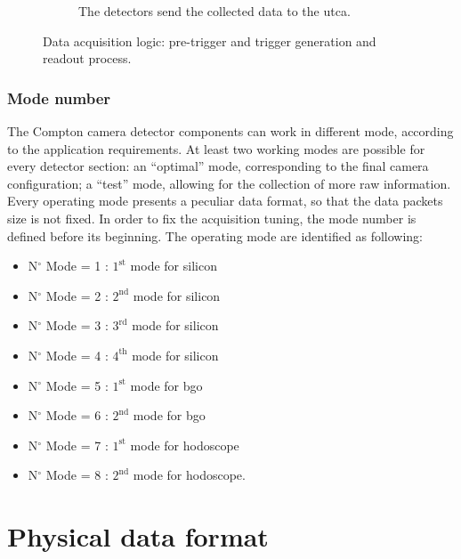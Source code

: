 \begin{figure}
\begin{subfigure}[t]{0.5\textwidth}
\caption[The detectors send the collected data to the \gls{utca}.]{The detectors send the collected data to the \gls{utca}.}\label{chapappA::subfig::triggerLogic_6}
\end{subfigure}%
\caption{Data acquisition logic: pre-trigger and trigger generation and readout process.}
\label{chapappA::fig::triggerGeneration}
\end{figure}


\subsubsection{Mode number}\label{chapappA::subsubsec::modeN}
The Compton camera detector components can work in different mode, according to the application requirements. At least two working modes are possible for every detector section: an \enquote{optimal} mode, corresponding to the final camera configuration; a \enquote{test} mode, allowing for the collection of more raw information. Every operating mode presents a peculiar data format, so that the data packets size is not fixed. In order to fix the acquisition tuning, the mode number is defined before its beginning.\newline
The operating mode are identified as following: \newline
\begin{itemize}
	\item N$^{\circ}$ Mode = 1 : $1^{\mathrm{st}}$ mode for silicon
	\item N$^{\circ}$ Mode = 2 : $2^{\mathrm{nd}}$ mode for silicon
	\item N$^{\circ}$ Mode = 3 : $3^{\mathrm{rd}}$ mode for silicon
	\item N$^{\circ}$ Mode = 4 : $4^{\mathrm{th}}$ mode for silicon
	\item N$^{\circ}$ Mode = 5 : $1^{\mathrm{st}}$ mode for \gls{bgo}
	\item N$^{\circ}$ Mode = 6 : $2^{\mathrm{nd}}$ mode for \gls{bgo}
	\item N$^{\circ}$ Mode = 7 : $1^{\mathrm{st}}$ mode for hodoscope
	\item N$^{\circ}$ Mode = 8 : $2^{\mathrm{nd}}$ mode for hodoscope.\newline
\end{itemize}



\section{Physical data format}\label{chapappA::sec::physDataFormat}

